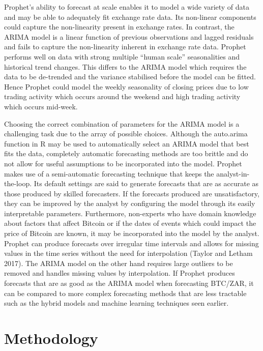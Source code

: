 \documentclass[12pt,a4paper]{article}
\numberwithin{equation}{section}
\numberwithin{figure}{section}
\numberwithin{table}{section}
\begin{document}
Prophet's ability to forecast at scale enables it to model a wide
variety of data and may be able to adequately fit exchange rate data.
Its non-linear components could capture the non-linearity present in
exchange rates. In contrast, the ARIMA model is a linear function of
previous observations and lagged residuals and fails to capture the
non-linearity inherent in exchange rate data. Prophet performs well on
data with strong multiple ``human scale'' seasonalities and historical
trend changes. This differs to the ARIMA model which requires the data
to be de-trended and the variance stabilised before the model can be
fitted. Hence Prophet could model the weekly seasonality of closing
prices due to low trading activity which occurs around the weekend and
high trading activity which occurs mid-week.

Choosing the correct combination of parameters for the ARIMA model is a
challenging task due to the array of possible choices. Although the
auto.arima function in R may be used to automatically select an ARIMA
model that best fits the data, completely automatic forecasting methods
are too brittle and do not allow for useful assumptions to be
incorporated into the model. Prophet makes use of a semi-automatic
forecasting technique that keeps the analyst-in-the-loop. Its default
settings are said to generate forecasts that are as accurate as those
produced by skilled forecasters. If the forecasts produced are
unsatisfactory, they can be improved by the analyst by configuring the
model through its easily interpretable parameters. Furthermore,
non-experts who have domain knowledge about factors that affect Bitcoin
or if the dates of events which could impact the price of Bitcoin are
known, it may be incorporated into the model by the analyst. Prophet can
produce forecasts over irregular time intervals and allows for missing
values in the time series without the need for interpolation (Taylor and
Letham 2017). The ARIMA model on the other hand requires large outliers
to be removed and handles missing values by interpolation. If Prophet
produces forecasts that are as good as the ARIMA model when forecasting
BTC/ZAR, it can be compared to more complex forecasting methods that are
less tractable such as the hybrid models and machine learning techniques
seen earlier.

\section{\texorpdfstring{Methodology
\label{Methodology}}{Methodology }}\label{methodology}
\end{document}

